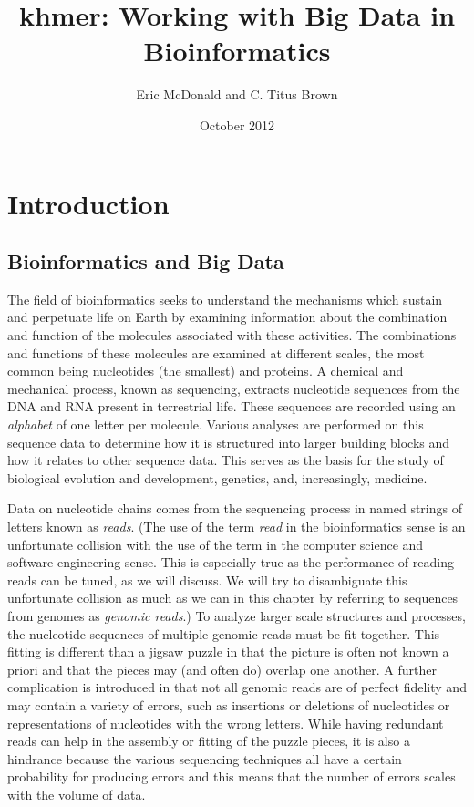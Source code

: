 \documentclass{article}
\title{khmer: Working with Big Data in Bioinformatics}
\author{Eric McDonald and C. Titus Brown}
\date{October 2012}
\begin{document}
\maketitle

\section{Introduction}

\subsection{Bioinformatics and Big Data}

The field of bioinformatics seeks to understand the mechanisms which sustain and perpetuate life on Earth by examining information about the combination and function of the molecules associated with these activities. The combinations and functions of these molecules are examined at different scales, the most common being nucleotides (the smallest) and proteins. A chemical and mechanical process, known as sequencing, extracts nucleotide sequences from the DNA and RNA present in terrestrial life. These sequences are recorded using an \textit{alphabet} of one letter per molecule. Various analyses are performed on this sequence data to determine how it is structured into larger building blocks and how it relates to other sequence data. This serves as the basis for the study of biological evolution and development, genetics, and, increasingly, medicine.

Data on nucleotide chains comes from the sequencing process in named strings of letters known as \textit{reads}. (The use of the term \textit{read} in the bioinformatics sense is an unfortunate collision with the use of the term in the computer science and software engineering sense. This is especially true as the performance of reading reads can be tuned, as we will discuss. We will try to disambiguate this unfortunate collision as much as we can in this chapter by referring to sequences from genomes as \textit{genomic reads}.) To analyze larger scale structures and processes, the nucleotide sequences of multiple genomic reads must be fit together. This fitting is different than a jigsaw puzzle in that the picture is often not known a priori and that the pieces may (and often do) overlap one another. A further complication is introduced in that not all genomic reads are of perfect fidelity and may contain a variety of errors, such as insertions or deletions of nucleotides or representations of nucleotides with the wrong letters. While having redundant reads can help in the assembly or fitting of the puzzle pieces, it is also a hindrance because the various sequencing techniques all have a certain probability for producing errors and this means that the number of errors scales with the volume of data.
\end{document}
